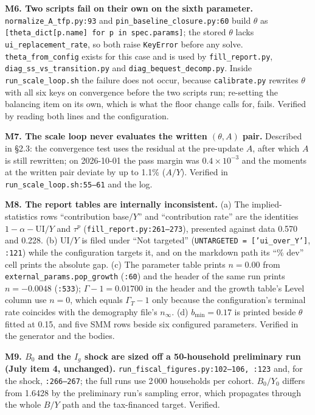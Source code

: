 \documentclass[11pt,a4paper]{article}
\newcommand{\code}[1]{\texttt{#1}}
\begin{document}
\textbf{M6. Two scripts fail on their own on the sixth parameter.} \code{normalize_A_tfp.py:93} and \code{pin_baseline_closure.py:60} build $\theta$ as \code{[theta_dict[p.name] for p in spec.params]}; the stored $\theta$ lacks \code{ui_replacement_rate}, so both raise \code{KeyError} before any solve. \code{theta_from_config} exists for this case and is used by \code{fill_report.py}, \code{diag_ss_vs_transition.py} and \code{diag_bequest_decomp.py}. Inside \code{run_scale_loop.sh} the failure does not occur, because \code{calibrate.py} rewrites $\theta$ with all six keys on convergence before the two scripts run; re-setting the balancing item on its own, which is what the floor change calls for, fails. Verified by reading both lines and the configuration.

\textbf{M7. The scale loop never evaluates the written $(\theta, A)$ pair.} Described in \S2.3: the convergence test uses the residual at the pre-update $A$, after which $A$ is still rewritten; on 2026-10-01 the pass margin was $0.4\times 10^{-3}$ and the moments at the written pair deviate by up to 1.1\% ($A/Y$). Verified in \code{run_scale_loop.sh:55--61} and the log.

\textbf{M8. The report tables are internally inconsistent.} (a) The implied-statistics rows ``contribution base$/Y$'' and ``contribution rate'' are the identities $1 - \alpha - \mathrm{UI}/Y$ and $\tau^p$ (\code{fill_report.py:261--273}), presented against data 0.570 and 0.228. (b) UI$/Y$ is filed under ``Not targeted'' (\code{UNTARGETED = ['ui_over_Y']}, \code{:121}) while the configuration targets it, and on the markdown path its ``\% dev'' cell prints the absolute gap. (c) The parameter table prints $n = 0.00$ from \code{external_params.pop_growth} (\code{:60}) and the header of the same run prints $n = -0.0048$ (\code{:533}); $\Gamma - 1 = 0.01700$ in the header and the growth table's Level column use $n = 0$, which equals $\Gamma_T - 1$ only because the configuration's terminal rate coincides with the demography file's $n_\infty$. (d) $b_{\min} = 0.17$ is printed beside $\theta$ fitted at 0.15, and five SMM rows beside six configured parameters. Verified in the generator and the bodies.

\textbf{M9. $B_0$ and the $I_g$ shock are sized off a 50-household preliminary run (July item 4, unchanged).} \code{run_fiscal_figures.py:102--106, :123} and, for the shock, \code{:266--267}; the full runs use 2\,000 households per cohort. $B_0/Y_0$ differs from 1.6428 by the preliminary run's sampling error, which propagates through the whole $B/Y$ path and the tax-financed target. Verified.
\end{document}
